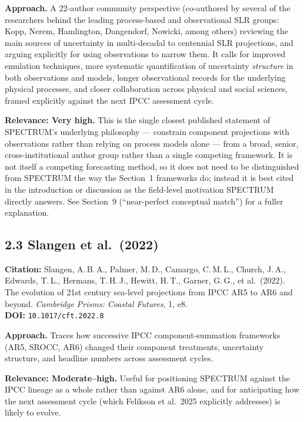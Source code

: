 \documentclass[11pt]{article}
\begin{document}
\noindent\textbf{Approach.} A 22-author community perspective (co-authored
by several of the researchers behind the leading process-based and
observational SLR groups: Kopp, Nerem, Hamlington, Dangendorf, Nowicki,
among others) reviewing the main sources of uncertainty in multi-decadal to
centennial SLR projections, and arguing explicitly for using observations to
narrow them. It calls for improved emulation techniques, more systematic
quantification of uncertainty \emph{structure} in both observations and
models, longer observational records for the underlying physical processes,
and closer collaboration across physical and social sciences, framed
explicitly against the next IPCC assessment cycle.

\noindent\textbf{Relevance: Very high.} This is the single closest published
statement of SPECTRUM's underlying philosophy --- constrain component
projections with observations rather than relying on process models alone
--- from a broad, senior, cross-institutional author group rather than a
single competing framework. It is not itself a competing forecasting
method, so it does not need to be distinguished from SPECTRUM the way the
Section~1 frameworks do; instead it is best cited in the introduction or
discussion as the field-level motivation SPECTRUM directly answers. See
Section~9 (``near-perfect conceptual match'') for a fuller explanation.

\subsection*{2.3 Slangen et al.\ (2022)}

\noindent\textbf{Citation:} Slangen, A.\,B.\,A., Palmer, M.\,D.,
Camargo, C.\,M.\,L., Church, J.\,A., Edwards, T.\,L., Hermans, T.\,H.\,J.,
Hewitt, H.\,T., Garner, G.\,G., et al.\ (2022). The evolution of 21st
century sea-level projections from IPCC AR5 to AR6 and beyond.
\textit{Cambridge Prisms: Coastal Futures}, 1, e8.\\
\textbf{DOI:} \texttt{10.1017/cft.2022.8}

\noindent\textbf{Approach.} Traces how successive IPCC component-summation
frameworks (AR5, SROCC, AR6) changed their component treatments, uncertainty
structure, and headline numbers across assessment cycles.

\noindent\textbf{Relevance: Moderate--high.} Useful for positioning SPECTRUM
against the IPCC lineage as a whole rather than against AR6 alone, and for
anticipating how the next assessment cycle (which Felikson et al.\ 2025
explicitly addresses) is likely to evolve.
\end{document}
